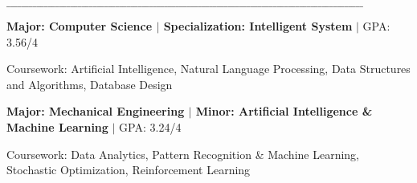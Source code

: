\vspace{-0.9em}
\textbf{$\_\_\_\_\_\_\_\_\_\_\_\_\_\_\_\_\_\_\_\_\_\_\_\_\_\_\_\_\_\_\_\_\_\_\_\_\_\_\_\_\_\_\_\_\_\_\_\_\_\_\_\_\_\_\_\_\_\_\_\_\_\_\_\_\_\_\_\_\_\_\_\_\_\_\_\_\_\_\_\_\_\_\_\_\_\_\_\_\_\_\_\_\_\_\_$}

\vspace{0.35em}
\begin{spacing}{1.08}
\textnormal{\textbf{Major: Computer Science \texorpdfstring{$\vert$}{|} Specialization: Intelligent System} \texorpdfstring{$\vert$}{|} GPA: 3.56/4}

\textnormal{Coursework: Artificial Intelligence, Natural Language Processing, Data Structures and Algorithms, Database Design}
\end{spacing}
\vspace{-0.1em}
\vspace{0.35em}
\begin{spacing}{1.08}
\textnormal{\textbf{Major: Mechanical Engineering \texorpdfstring{$\vert$}{|} Minor: Artificial Intelligence \& Machine Learning} \texorpdfstring{$\vert$}{|} GPA: 3.24/4}

\textnormal{Coursework: Data Analytics, Pattern Recognition \& Machine Learning, Stochastic Optimization, Reinforcement Learning}
\end{spacing}